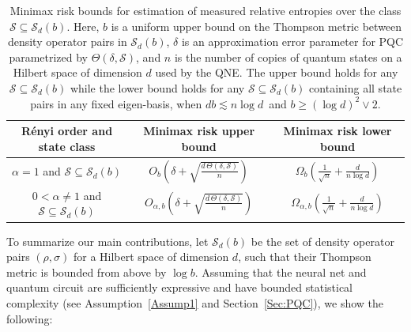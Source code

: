 \documentclass[a4paper,onecolumn,11pt,accepted=2026-05-12]{quantumarticle}
\newcommand{\cS}{\mathcal{S}}
\begin{document}
 
\begin{table}
\centering
\begin{tabular}{ |c|c|c |}
 \hline
 R\'enyi order and state class&  Minimax risk upper bound     &  Minimax risk lower bound   \\
 \hline
 $\alpha=1$ and $\cS \subseteq \cS_d(b)$   & $O_b\!\left(\delta+\sqrt{\frac{d\,\Theta(\delta,\cS)}{n}}\right)$    & $\Omega_b\!\left(\frac{1}{\sqrt{n}}+\frac{d}{n \log d}\right)$ \\[4pt]
 \hline
$0 <\alpha  \neq 1 $ and  $\cS \subseteq \cS_d(b)$     & $O_{\alpha,b}\!\left(\delta +   \sqrt{\frac{d\,\Theta(\delta,\cS)}{n}}\right)$    & $\Omega_{\alpha,b}\!\left(\frac{1}{\sqrt{n}}+\frac{d}{n \log d}\right)$  \\[4pt]
 \hline
\end{tabular}
\caption{Minimax risk bounds for estimation of measured relative entropies over the class  $\cS \subseteq \cS_d(b)$.  Here, $b$ is a uniform upper bound on the Thompson metric  between density operator pairs in $\cS_d(b)$, $\delta$ is an approximation error parameter for PQC parametrized by $\Theta(\delta,\cS)$, and $n$ is the number of copies of quantum states on a Hilbert space of dimension $d$  used by the QNE. The upper bound holds for any $\cS \subseteq \cS_d(b)$ while the lower bound holds for any $\cS \subseteq \cS_d(b)$ containing all state pairs in any fixed eigen-basis, when  $d b \lesssim n \log d\,$ and $b \geq (\log d)^2 \vee 2$.}
\label{table:summ-main-cont}
\end{table}
To summarize our main contributions, let $\cS_d(b)$ be the set of density operator pairs $(\rho,\sigma)$ for a Hilbert space of dimension $d$, such that their Thompson metric \cite{thompson_1963} is bounded from above by $\log b$.  Assuming that the neural net and quantum circuit are sufficiently expressive and have bounded statistical complexity (see Assumption~\ref{Assump1} and Section~\ref{Sec:PQC}), we show the following: 
\end{document}
